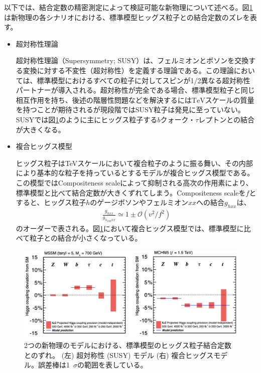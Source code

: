 以下では、結合定数の精密測定によって検証可能な新物理について述べる。図\ref{bsmdecay}は新物理の各シナリオにおける、標準模型ヒッグス粒子との結合定数のズレを表す。
\begin{itemize}
\item{超対称性理論}

超対称性理論（Supersymmetry; SUSY）は、フェルミオンとボソンを交換する変換に対する不変性（超対称性）を定義する理論である。この理論においては、標準模型におけるすべての粒子に対してスピンが1/2異なる超対称性パートナーが導入される。超対称性が完全である場合、標準模型粒子と同じ相互作用を持ち、後述の階層性問題などを解決するには$\mathrm{TeV}$スケールの質量を持つことが期待されるが現段階ではSUSY粒子は発見に至っていない。SUSYでは図\ref{bsmdecay}のように主にヒッグス粒子する$b$クォーク・$\tau$レプトンとの結合が大きくなる。
\item{複合ヒッグス模型}

ヒッグス粒子はTeVスケールにおいて複合粒子のように振る舞い、その内部により基本的な粒子を持っているとするモデルが複合ヒッグス模型である。この模型ではCompositeness scaleによって抑制される高次の作用素により、標準模型と比べて結合定数が大きくずれてしまう。Compositeness scaleを$f$とすると、ヒッグス粒子$h$のゲージボソンやフェルミオン$xx$への結合$g_{hxx}$は、
\begin{align}
\frac{g_{hxx}}{g_{h_{SM}xx}} \simeq 1 \pm \mathcal{O}(v^2 / f^2)
\end{align}
のオーダーで表される。図\ref{bsmdecay}において複合ヒッグス模型では、標準模型に比べて粒子との結合が小さくなっている。
\end{itemize}
\begin{figure}[H]
	\begin{center}
 \includegraphics[keepaspectratio, scale=0.25]
 	{Figure/Introduction/bsmdecay.png}
 		\caption[SUSY, 複合ヒッグスモデルにおけるヒッグス結合定数]{2つの新物理のモデルにおける、標準模型のヒッグス粒子結合定数とのずれ。 (左) 超対称性 (SUSY) モデル (右) 複合ヒッグスモデル。誤差棒は1\, $\sigma$の範囲を表している。}
 		\label{bsmdecay}
	\end{center}
\end{figure}
